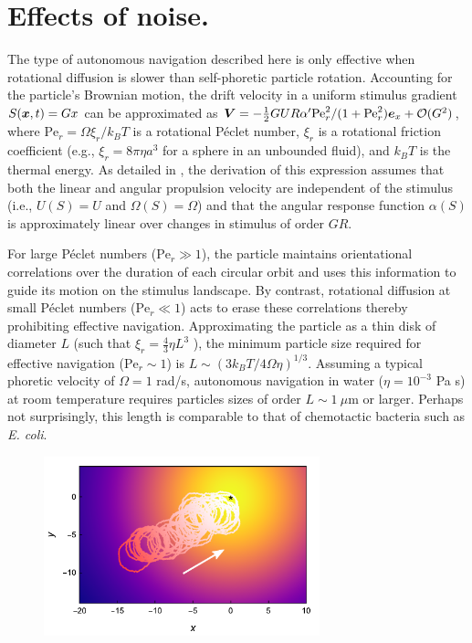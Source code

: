\section{Effects of noise.} 
The type of autonomous navigation described here is only effective when rotational diffusion is slower than self-phoretic particle rotation.  Accounting for the particle's Brownian motion, the drift velocity in a uniform stimulus gradient $S(\boldsymbol{x},t)=G x$ can be approximated as $\boldsymbol{V}=-\tfrac{1}{2} G U R \alpha' \text{Pe}^2_r / (1+ \text{Pe}_r^2) \boldsymbol{e}_x +\mathcal{O}(G^2)$, where $\text{Pe}_r =\Omega\xi_r/k_B T$ is a rotational P\'eclet number, $\xi_r$ is a rotational friction coefficient (e.g., $\xi_r=8\pi\eta a^3$ for a sphere in an unbounded fluid), and $k_B T$ is the thermal energy.  As detailed in \cite{Supp}, the derivation of this expression assumes that both the linear and angular propulsion velocity are independent of the stimulus (i.e., $U(S)=U$ and $\Omega(S)=\Omega$) and that the angular response function $\alpha(S)$ is approximately linear over changes in stimulus of order $GR$.  

For large P\'eclet numbers ($\text{Pe}_r\gg1$), the particle maintains orientational correlations over the duration of each circular orbit and uses this information to guide its motion on the stimulus landscape.  By contrast, rotational diffusion at small P\'eclet numbers ($\text{Pe}_r\ll1$) acts to erase these correlations thereby prohibiting effective navigation. Approximating the particle as a thin disk of diameter $L$ (such that $\xi_r=\tfrac{4}{3}\eta L^3$ \cite{Kim2005}), the minimum particle size required for effective navigation ($\text{Pe}_r\sim1$) is $L\sim(3k_B T/4\Omega\eta)^{1/3}$.  Assuming a typical phoretic velocity of $\Omega=1$ rad/s, autonomous navigation in water ($\eta=10^{-3}$ Pa s) at room temperature requires particles sizes of order $L\sim 1~\mu$m or larger. Perhaps not surprisingly, this length is comparable to that of chemotactic bacteria such as \emph{E. coli}. 

\begin{figure}[h!]
     \centering
     \includegraphics[width=8cm]{figures/4_4.pdf}
     \caption{}
     \label{fig:4.4}
 \end{figure}


